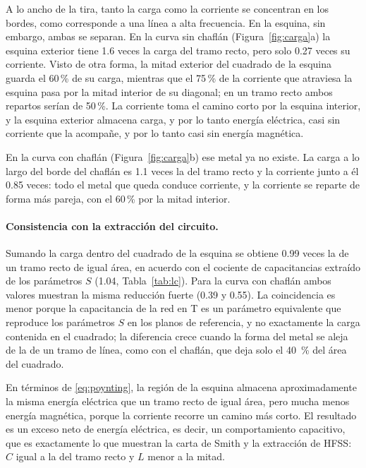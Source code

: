 \documentclass[11pt,letterpaper]{article}
\begin{document}
A lo ancho de la tira, tanto la carga como la corriente se concentran en los bordes, como corresponde a una línea a alta frecuencia. En la esquina, sin embargo, ambas se separan. En la curva sin chaflán (Figura~\ref{fig:carga}a) la esquina exterior tiene 1.6 veces la carga del tramo recto, pero solo 0.27 veces su corriente. Visto de otra forma, la mitad exterior del cuadrado de la esquina guarda el 60\,\% de su carga, mientras que el 75\,\% de la corriente que atraviesa la esquina pasa por la mitad interior de su diagonal; en un tramo recto ambos repartos serían de 50\,\%. La corriente toma el camino corto por la esquina interior, y la esquina exterior almacena carga, y por lo tanto energía eléctrica, casi sin corriente que la acompañe, y por lo tanto casi sin energía magnética.

En la curva con chaflán (Figura~\ref{fig:carga}b) ese metal ya no existe. La carga a lo largo del borde del chaflán es 1.1 veces la del tramo recto y la corriente junto a él 0.85 veces: todo el metal que queda conduce corriente, y la corriente se reparte de forma más pareja, con el 60\,\% por la mitad interior.

\paragraph{Consistencia con la extracción del circuito.} Sumando la carga dentro del cuadrado de la esquina se obtiene 0.99 veces la de un tramo recto de igual área, en acuerdo con el cociente de capacitancias extraído de los parámetros $S$ (1.04, Tabla~\ref{tab:lc}). Para la curva con chaflán ambos valores muestran la misma reducción fuerte (0.39 y 0.55). La coincidencia es menor porque la capacitancia de la red en T es un parámetro equivalente que reproduce los parámetros $S$ en los planos de referencia, y no exactamente la carga contenida en el cuadrado; la diferencia crece cuando la forma del metal se aleja de la de un tramo de línea, como con el chaflán, que deja solo el \SI{40}{\percent} del área del cuadrado.

En términos de \eqref{eq:poynting}, la región de la esquina almacena aproximadamente la misma energía eléctrica que un tramo recto de igual área, pero mucha menos energía magnética, porque la corriente recorre un camino más corto. El resultado es un exceso neto de energía eléctrica, es decir, un comportamiento capacitivo, que es exactamente lo que muestran la carta de Smith y la extracción de HFSS: $C$ igual a la del tramo recto y $L$ menor a la mitad.
\end{document}
